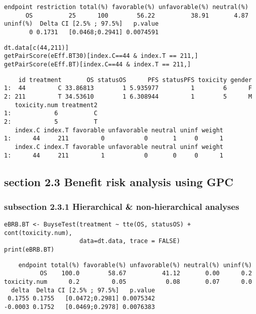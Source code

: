 \documentclass[12pt]{article}
\begin{document}
\begin{verbatim}
endpoint restriction total(%) favorable(%) unfavorable(%) neutral(%)
      OS          25      100        56.22          38.91       4.87
uninf(%)  Delta CI [2.5% ; 97.5%]   p.value
       0 0.1731   [0.0468;0.2941] 0.0074591
\end{verbatim}


\lstset{language=r,label= ,caption= ,captionpos=b,numbers=none}
\begin{lstlisting}
dt.data[c(44,211)]
getPairScore(eEff.BT30)[index.C==44 & index.T == 211,]
getPairScore(eEff.BT)[index.C==44 & index.T == 211,]
\end{lstlisting}

\begin{verbatim}
    id treatment       OS statusOS      PFS statusPFS toxicity gender
1:  44         C 33.86813        1 5.935977         1        6      F
2: 211         T 34.53610        1 6.308944         1        5      M
   toxicity.num treatment2
1:            6          C
2:            5          T
   index.C index.T favorable unfavorable neutral uninf weight
1:      44     211         0           0       1     0      1
   index.C index.T favorable unfavorable neutral uninf weight
1:      44     211         1           0       0     0      1
\end{verbatim}

\subsection{section 2.3 Benefit risk analysis using GPC}
\label{sec:org9235831}

\subsubsection{subsection 2.3.1 Hierarchical \& non-hierarchical analyses}
\label{sec:org5b86843}
\lstset{language=r,label= ,caption= ,captionpos=b,numbers=none}
\begin{lstlisting}
eBRB.BT <- BuyseTest(treatment ~ tte(OS, statusOS) + cont(toxicity.num),
                     data=dt.data, trace = FALSE)
print(eBRB.BT)
\end{lstlisting}

\begin{verbatim}
    endpoint total(%) favorable(%) unfavorable(%) neutral(%) uninf(%)
          OS    100.0        58.67          41.12       0.00      0.2
toxicity.num      0.2         0.05           0.08       0.07      0.0
  delta  Delta CI [2.5% ; 97.5%]   p.value
 0.1755 0.1755   [0.0472;0.2981] 0.0075342
-0.0003 0.1752   [0.0469;0.2978] 0.0076383
\end{verbatim}
\end{document}
